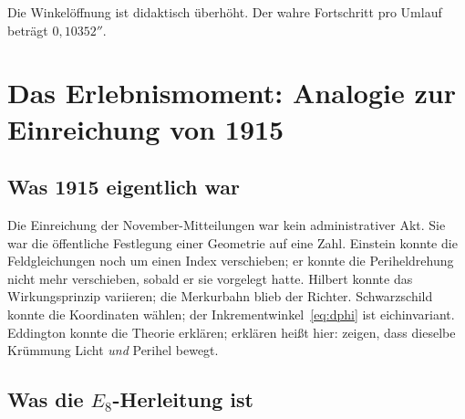 \documentclass[11pt,a4paper]{article}
\theoremstyle{definition}
\theoremstyle{remark}
\newcommand{\dphi}{\delta\phi}
\begin{document}
\vspace{0.7em}
\begin{center}
\end{center}
\vspace{0.3em}
\begin{center}
{\scriptsize Die Winkelöffnung ist didaktisch überhöht. Der wahre Fortschritt pro Umlauf beträgt \(0{,}10352''\).}
\end{center}

\section{Das Erlebnismoment: Analogie zur Einreichung von 1915}

\subsection{Was 1915 eigentlich war}

Die Einreichung der November-Mitteilungen war kein administrativer Akt. Sie war die öffentliche Festlegung einer Geometrie auf eine Zahl. Einstein konnte die Feldgleichungen noch um einen Index verschieben; er konnte die Periheldrehung nicht mehr verschieben, sobald er sie vorgelegt hatte. Hilbert konnte das Wirkungsprinzip variieren; die Merkurbahn blieb der Richter. Schwarzschild konnte die Koordinaten wählen; der Inkrementwinkel~\eqref{eq:dphi} ist eichinvariant. Eddington konnte die Theorie erklären; erklären heißt hier: zeigen, dass dieselbe Krümmung Licht \emph{und} Perihel bewegt.

\subsection{Was die \texorpdfstring{\(E_8\)}{E8}-Herleitung ist}
\end{document}
